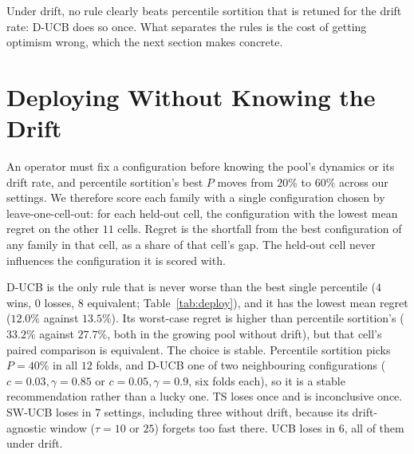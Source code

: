 \documentclass[sigconf,anonymous,review,nonacm]{acmart}
\begin{document}
Under drift, no rule clearly beats percentile sortition that is retuned for the drift rate:
D-UCB does so once.
What separates the rules is the cost of getting optimism wrong, which the next section
makes concrete.

\section{Deploying Without Knowing the Drift}
\label{sec:deploy}

An operator must fix a configuration before knowing the pool's dynamics or its drift rate,
and percentile sortition's best $P$ moves from $20\%$ to $60\%$ across our settings. We
therefore score each family with a single configuration chosen by leave-one-cell-out: for
each held-out cell, the configuration with the lowest mean regret on the other $11$ cells.
Regret is the shortfall from the best configuration of any family in that cell, as a share
of that cell's gap. The held-out cell never influences the configuration it is scored with.

\begin{table}[t]\centering\small
\caption{One configuration per rule, chosen by leave-one-cell-out. Regret on the held-out
cell, as a percentage of its gap (mean and worst over the $12$ cells), and paired verdicts
against percentile sortition's leave-one-out choice on that cell's $50$ seeds, Holm-adjusted
across all cells and rules.}
\label{tab:deploy}
\setlength{\tabcolsep}{4pt}

\end{table}

D-UCB is the only rule that is never worse than the best single percentile ($4$ wins,
$0$ losses, $8$ equivalent; Table~\ref{tab:deploy}), and it has the lowest mean regret
($12.0\%$ against $13.5\%$). Its worst-case regret is higher than percentile sortition's
($33.2\%$ against $27.7\%$, both in the growing pool without drift), but that cell's paired
comparison is equivalent. The choice is stable. Percentile sortition picks $P=40\%$ in all
$12$ folds, and D-UCB one of two neighbouring configurations ($c=0.03,\gamma=0.85$ or
$c=0.05,\gamma=0.9$, six folds each), so it is a stable recommendation rather than a lucky
one. TS loses once and is inconclusive once. SW-UCB loses in $7$ settings, including three
without drift, because its drift-agnostic window ($\tau=10$ or $25$) forgets too fast there.
UCB loses in $6$, all of them under drift.
\end{document}
